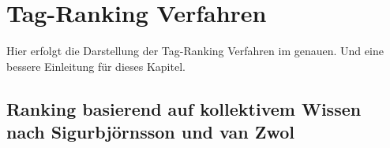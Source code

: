 \section{Tag-Ranking Verfahren} %
\label{sec:tag_ranking_verfahren}
Hier erfolgt die Darstellung der Tag-Ranking Verfahren im genauen. Und eine bessere Einleitung für dieses Kapitel.

% 
% 

\subsection{Ranking basierend auf kollektivem Wissen nach Sigurbjörnsson und van Zwol} %
\label{sub:ranking_basierend_auf_kollektivem_wissen_nach_zwol}




